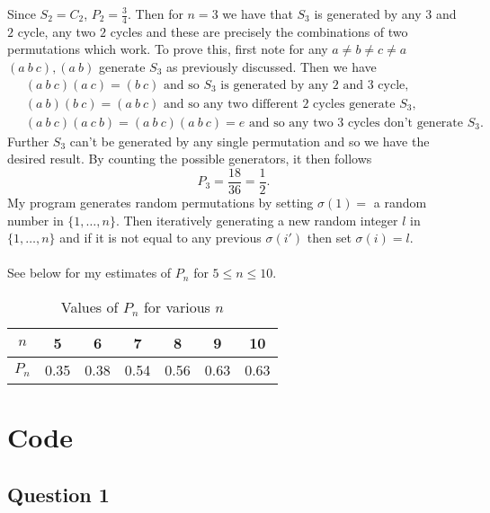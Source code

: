 \documentclass{article}
\begin{document}
Since $S_2=C_2$,  $P_2=\frac{3}{4}.$ Then for $n=3$ we have that $S_3$ is generated by any $3$ and $2$ cycle,  any two $2$ cycles and these are precisely the combinations of two permutations which work.  To prove this, first note for any $a\neq b\neq c\neq a$ $(a\ b\ c),(a\ b)$ generate $S_3$ as previously discussed.  Then we have 
\begin{align*}
	&\ (a\ b\ c)(a\ c)=(b\ c)\text{ and so } S_3\text{ is generated by any 2 and 3 cycle,} \\ 
	&\ (a\ b)(b\ c)=(a\ b\ c)\text{ and so any two different 2 cycles generate } S_3,\\
	&\ (a\ b\ c)(a\ c\ b)=(a\ b\ c)(a \ b\ c)=e \text{ and so any two 3 cycles don't generate } S_3. 
\end{align*}
Further $S_3$ can't be generated by any single permutation and so we have the desired result.  By counting the possible generators, it then follows
\[P_3=\frac{18}{36}=\frac{1}{2}.\]
My program generates random permutations by setting $\sigma (1)=$ a random number in $\{1,\ldots ,n\}$. Then iteratively generating a new random integer $l$ in $\{1,\ldots,n\}$ and if it is not equal to any previous $\sigma(i')$ then set $\sigma (i)=l$. \\\\

See below for my estimates of $P_n$ for $5\leq n\leq 10$.
\newpage
\begin{table}[hp]
\begin{center}
\begin{tabular}{|c|cccccc|}
\hline
$n$   & 5    & 6    & 7    & 8    & 9    & 10   \\ \hline
$P_n$ & 0.35 & 0.38 & 0.54 & 0.56 & 0.63 & 0.63 \\ \hline
\end{tabular}
\caption{Values of $P_n$ for various $n$}
\end{center}
\end{table}
\newpage
\newpage





\section{Code}
\subsection{Question 1}


\end{document}
